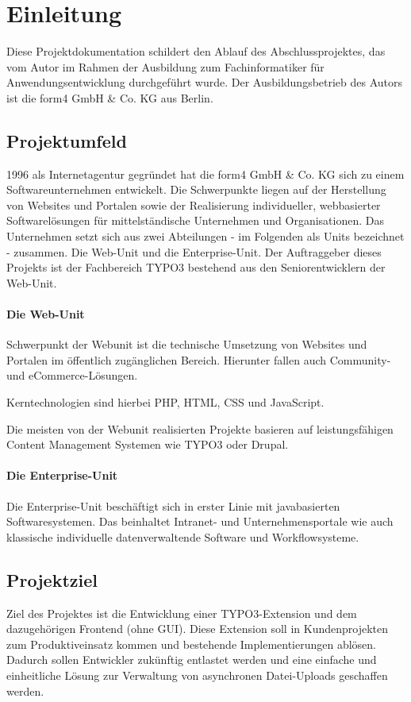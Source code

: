 \section{Einleitung}
\label{sec:Einleitung}
Diese Projektdokumentation schildert den Ablauf des Abschlussprojektes, das vom Autor im Rahmen der Ausbildung zum Fachinformatiker für Anwendungsentwicklung durchgeführt wurde. Der Ausbildungsbetrieb des Autors ist die form4 GmbH \& Co. KG aus Berlin.

\subsection{Projektumfeld} 
\label{sec:Projektumfeld}
1996 als Internetagentur gegründet hat die form4 GmbH \& Co. KG sich zu einem Softwareunternehmen entwickelt. Die Schwerpunkte liegen auf der Herstellung von Websites und Portalen sowie der Realisierung individueller, webbasierter Softwarelösungen für mittelständische Unternehmen und Organisationen. Das Unternehmen setzt sich aus zwei Abteilungen - im Folgenden als Units bezeichnet - zusammen. Die Web-Unit und die Enterprise-Unit. Der Auftraggeber dieses Projekts ist der Fachbereich TYPO3 bestehend aus den Seniorentwicklern der Web-Unit.

\paragraph{Die Web-Unit}
Schwerpunkt der Webunit ist die technische Umsetzung von Websites und Portalen im öffentlich zugänglichen Bereich. Hierunter fallen auch Community- und eCommerce-Lösungen.

Kerntechnologien sind hierbei PHP, HTML, CSS und JavaScript.

Die meisten von der Webunit realisierten Projekte basieren auf leistungsfähigen Content Management Systemen wie TYPO3 oder Drupal.

\paragraph{Die Enterprise-Unit}
Die Enterprise-Unit beschäftigt sich in erster Linie mit javabasierten Softwaresystemen. Das beinhaltet Intranet- und Unternehmensportale wie auch klassische individuelle datenverwaltende Software und Workflowsysteme.

\subsection{Projektziel} 
\label{sec:Projektziel}
Ziel des Projektes ist die Entwicklung einer TYPO3-Extension und dem dazugehörigen Frontend (ohne GUI). Diese Extension soll in Kundenprojekten zum Produktiveinsatz kommen und bestehende Implementierungen ablösen. Dadurch sollen Entwickler zukünftig entlastet werden und eine einfache und einheitliche Lösung zur Verwaltung von asynchronen Datei-Uploads geschaffen werden. 


